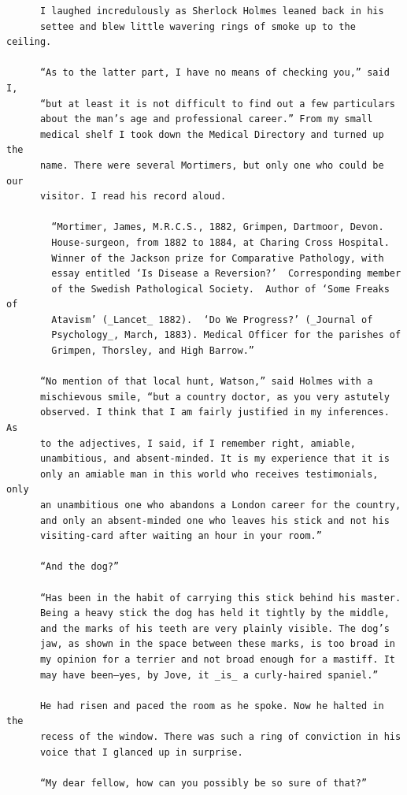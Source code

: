 \documentclass{article}
\begin{document}
\begin{verbatim}
      I laughed incredulously as Sherlock Holmes leaned back in his
      settee and blew little wavering rings of smoke up to the ceiling.

      “As to the latter part, I have no means of checking you,” said I,
      “but at least it is not difficult to find out a few particulars
      about the man’s age and professional career.” From my small
      medical shelf I took down the Medical Directory and turned up the
      name. There were several Mortimers, but only one who could be our
      visitor. I read his record aloud.

        “Mortimer, James, M.R.C.S., 1882, Grimpen, Dartmoor, Devon.
        House-surgeon, from 1882 to 1884, at Charing Cross Hospital.
        Winner of the Jackson prize for Comparative Pathology, with
        essay entitled ‘Is Disease a Reversion?’  Corresponding member
        of the Swedish Pathological Society.  Author of ‘Some Freaks of
        Atavism’ (_Lancet_ 1882).  ‘Do We Progress?’ (_Journal of
        Psychology_, March, 1883). Medical Officer for the parishes of
        Grimpen, Thorsley, and High Barrow.”

      “No mention of that local hunt, Watson,” said Holmes with a
      mischievous smile, “but a country doctor, as you very astutely
      observed. I think that I am fairly justified in my inferences. As
      to the adjectives, I said, if I remember right, amiable,
      unambitious, and absent-minded. It is my experience that it is
      only an amiable man in this world who receives testimonials, only
      an unambitious one who abandons a London career for the country,
      and only an absent-minded one who leaves his stick and not his
      visiting-card after waiting an hour in your room.”

      “And the dog?”

      “Has been in the habit of carrying this stick behind his master.
      Being a heavy stick the dog has held it tightly by the middle,
      and the marks of his teeth are very plainly visible. The dog’s
      jaw, as shown in the space between these marks, is too broad in
      my opinion for a terrier and not broad enough for a mastiff. It
      may have been—yes, by Jove, it _is_ a curly-haired spaniel.”

      He had risen and paced the room as he spoke. Now he halted in the
      recess of the window. There was such a ring of conviction in his
      voice that I glanced up in surprise.

      “My dear fellow, how can you possibly be so sure of that?”


\end{verbatim}
\end{document}

